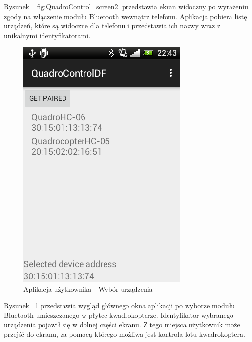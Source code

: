 Rysunek ~\ref{fig:QuadroControl_screen2} przedstawia ekran widoczny po wyrażeniu zgody na włączenie modułu Bluetooth wewnątrz telefonu. Aplikacja pobiera listę urządzeń, które są widoczne dla telefonu i przedstawia ich nazwy wraz z unikalnymi identyfikatorami. 

\begin{figure}[H]
	\centering
	\includegraphics[scale=0.6]{Pictures/DroidAtScreen/droid@screen-3.png}
	\caption[Aplikacja użytkownika - Ekran startory]{Aplikacja użytkownika - Wybór urządzenia}
	\label{fig:QuadroControl_screen3}
\end{figure}

Rysunek ~\ref{fig:QuadroControl_screen3} przedstawia wygląd głównego okna aplikacji po wyborze modułu Bluetooth umieszczonego w płytce kwadrokopterze. Identyfikator wybranego urządzenia pojawił się w dolnej części ekranu. Z tego miejsca użytkownik może przejść do ekranu, za pomocą którego możliwa jest kontrola lotu kwadrokoptera.

